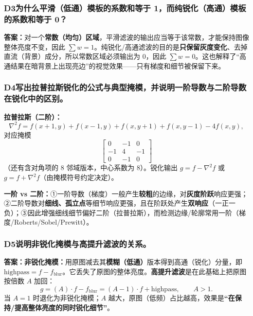 \subsubsection*{D3\quad 为什么平滑（低通）模板的系数和等于 1，而纯锐化（高通）模板的系数和等于 0？}
\textbf{答案：}对一个\textbf{常数（均匀）区域}，平滑滤波的输出应当等于该常数，才能保持图像整体亮度不变，因此 $\sum w=1$。纯锐化/高通滤波的目的是\textbf{只保留灰度变化}、去掉直流（背景）成分，所以常数区域必须输出为 0，因此 $\sum w=0$。这也解释了“高通结果在暗背景上出现亮边”的视觉效果——只有梯度和细节被保留下来。

\subsubsection*{D4\quad 写出拉普拉斯锐化的公式与典型掩模，并说明一阶导数与二阶导数在锐化中的区别。}
\textbf{拉普拉斯（二阶）：}
\[
\nabla^2 f=f(x+1,y)+f(x-1,y)+f(x,y+1)+f(x,y-1)-4f(x,y),
\]
对应掩模
\[
\begin{bmatrix}0&-1&0\\-1&4&-1\\0&-1&0\end{bmatrix}
\]
（还有含对角项的 8 邻域版本，中心系数为 8）。锐化输出 $g=f-\nabla^2f$ 或 $g=f+\nabla^2f$（由掩模符号约定决定）。

\textbf{一阶 vs 二阶：}①一阶导数（梯度）一般产生\textbf{较粗}的边缘，对\textbf{灰度阶跃}响应更强；②二阶导数对\textbf{细线、孤立点}等细节响应更强，且在阶跃处产生\textbf{双响应}（一正一负）；③因此增强细线细节偏好二阶（拉普拉斯），而检测边缘/轮廓常用一阶（梯度/Roberts/Sobel/Prewitt）。

\subsubsection*{D5\quad 说明非锐化掩模与高提升滤波的关系。}
\textbf{答案：非锐化掩模：}用原图减去其\textbf{模糊（低通）}版本得到高通（锐化）分量，即 $\mathrm{highpass}=f-f_{\mathrm{blur}}$。它丢失了原图的整体亮度。\textbf{高提升滤波}是在此基础上把原图按倍数 $A$ 加回：
\[
g=(A)\cdot f-f_{\mathrm{blur}}=(A-1)\cdot f+\mathrm{highpass},\qquad A>1.
\]
当 $A=1$ 时退化为非锐化掩模；$A$ 越大，原图（低频）占比越高，效果是\textbf{“在保持/提高整体亮度的同时锐化细节”}。

